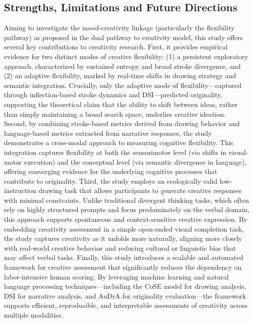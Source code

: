 \documentclass[../MA_Thesis.tex]{subfiles}
\begin{document}
\subsection*{Strengths, Limitations and Future Directions}
Aiming to investigate the mood-creativity linkage (particularly the flexibility pathway) as proposed in the dual pathway to creativity model, this study offers several key contributions to creativity research. First, it provides empirical evidence for two distinct modes of creative flexibility: (1) a persistent exploratory approach, characterized by sustained entropy and broad stroke divergence, and (2) an adaptive flexibility, marked by real-time shifts in drawing strategy and semantic integration. Crucially, only the adaptive mode of flexibility—captured through inflection-based stroke dynamics and DSI—predicted originality, supporting the theoretical claim that the ability to shift between ideas, rather than simply maintaining a broad search space, underlies creative ideation. Second, by combining stroke-based metrics derived from drawing behavior and language-based metrics extracted from narrative responses, the study demonstrates a cross-modal approach to measuring cognitive flexibility. This integration captures flexibility at both the sensorimotor level (via shifts in visual-motor execution) and the conceptual level (via semantic divergence in language), offering converging evidence for the underlying cognitive processes that contribute to originality.
Third, the study employs an ecologically valid low-instruction drawing task that allows participants to generate creative responses with minimal constraints. Unlike traditional divergent thinking tasks, which often rely on highly structured prompts and focus predominately on the verbal domain, this approach supports spontaneous and context-sensitive creative expression. By embedding creativity assessment in a simple open-ended visual completion task, the study captures creativity as it unfolds more naturally, aligning more closely with real-world creative behavior and reducing cultural or linguistic bias that may affect verbal tasks. Finally, this study introduces a scalable and automated framework for creative assessment that significantly reduces the dependency on labor-intensive human scoring. By leveraging machine learning and natural language processing techniques—including the CoSE model for drawing analysis, DSI for narrative analysis, and AuDrA for originality evaluation—the framework supports efficient, reproducible, and interpretable assessments of creativity across multiple modalities.
\end{document}
